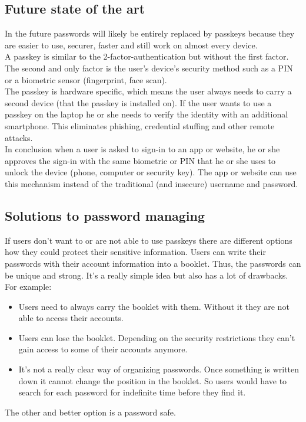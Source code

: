 \documentclass[conference]{IEEEtran}
\begin{document}
\subsection{Future state of the art}
In the future passwords will likely be entirely replaced by passkeys because they are easier to use, securer, faster and still work on almost every device.\\
A passkey is similar to the 2-factor-authentication but without the first factor. The second and only factor is the user's device's security method such as a PIN or a biometric sensor (fingerprint, face scan). \\
The passkey is hardware specific, which means the user always needs to carry a second device (that the passkey is installed on). If the user wants to use a passkey on the laptop he or she needs to verify the identity with an additional smartphone. This eliminates phishing, credential stuffing and other remote attacks. \\
In conclusion when a user is asked to sign-in to an app or website, he or she approves the sign-in with the same biometric or PIN that he or she uses to unlock the device (phone, computer or security key). The app or website can use this mechanism instead of the traditional (and insecure) username and password. \cite{b5}

\subsection{Solutions to password managing}
If users don't want to or are not able to use passkeys there are different options how they could protect their sensitive information. Users can write their passwords with their account information into a booklet. Thus, the passwords can be unique and strong. It's a really simple idea but also has a lot of drawbacks.
For example:
\begin{itemize}
    \item Users need to always carry the booklet with them. Without it they are not able to access their accounts.
    \item Users can lose the booklet. Depending on the security restrictions they can't gain access to some of their accounts anymore.
    \item It's not a really clear way of organizing passwords. Once something is written down it cannot change the position in the booklet. So users would have to search for each password for indefinite time before they find it.
\end{itemize}
The other and better option is a password safe.
\end{document}
